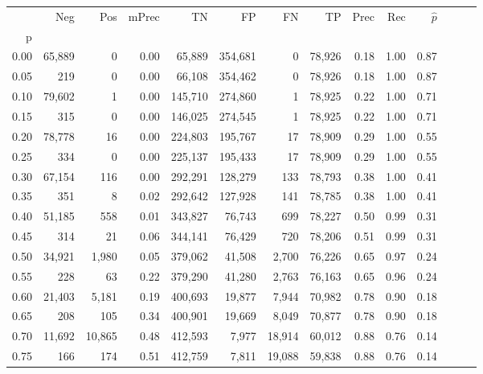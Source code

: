 \begin{tabular}{rrrrrrrrrrrrrr}
\toprule
{} &     Neg &     Pos & mPrec &       TN &       FP &      FN &      TP &  Prec &   Rec & $\hat{p}$ \\
p    &         &         &       &          &          &         &         &       &       &           \\
\midrule
0.00 &  65,889 &       0 &  0.00 &   65,889 &  354,681 &       0 &  78,926 &  0.18 &  1.00 &      0.87 \\
0.05 &     219 &       0 &  0.00 &   66,108 &  354,462 &       0 &  78,926 &  0.18 &  1.00 &      0.87 \\
0.10 &  79,602 &       1 &  0.00 &  145,710 &  274,860 &       1 &  78,925 &  0.22 &  1.00 &      0.71 \\
0.15 &     315 &       0 &  0.00 &  146,025 &  274,545 &       1 &  78,925 &  0.22 &  1.00 &      0.71 \\
0.20 &  78,778 &      16 &  0.00 &  224,803 &  195,767 &      17 &  78,909 &  0.29 &  1.00 &      0.55 \\
0.25 &     334 &       0 &  0.00 &  225,137 &  195,433 &      17 &  78,909 &  0.29 &  1.00 &      0.55 \\
0.30 &  67,154 &     116 &  0.00 &  292,291 &  128,279 &     133 &  78,793 &  0.38 &  1.00 &      0.41 \\
0.35 &     351 &       8 &  0.02 &  292,642 &  127,928 &     141 &  78,785 &  0.38 &  1.00 &      0.41 \\
0.40 &  51,185 &     558 &  0.01 &  343,827 &   76,743 &     699 &  78,227 &  0.50 &  0.99 &      0.31 \\
0.45 &     314 &      21 &  0.06 &  344,141 &   76,429 &     720 &  78,206 &  0.51 &  0.99 &      0.31 \\
0.50 &  34,921 &   1,980 &  0.05 &  379,062 &   41,508 &   2,700 &  76,226 &  0.65 &  0.97 &      0.24 \\
0.55 &     228 &      63 &  0.22 &  379,290 &   41,280 &   2,763 &  76,163 &  0.65 &  0.96 &      0.24 \\
0.60 &  21,403 &   5,181 &  0.19 &  400,693 &   19,877 &   7,944 &  70,982 &  0.78 &  0.90 &      0.18 \\
0.65 &     208 &     105 &  0.34 &  400,901 &   19,669 &   8,049 &  70,877 &  0.78 &  0.90 &      0.18 \\
0.70 &  11,692 &  10,865 &  0.48 &  412,593 &    7,977 &  18,914 &  60,012 &  0.88 &  0.76 &      0.14 \\
0.75 &     166 &     174 &  0.51 &  412,759 &    7,811 &  19,088 &  59,838 &  0.88 &  0.76 &      0.14 \\

\end{tabular}
